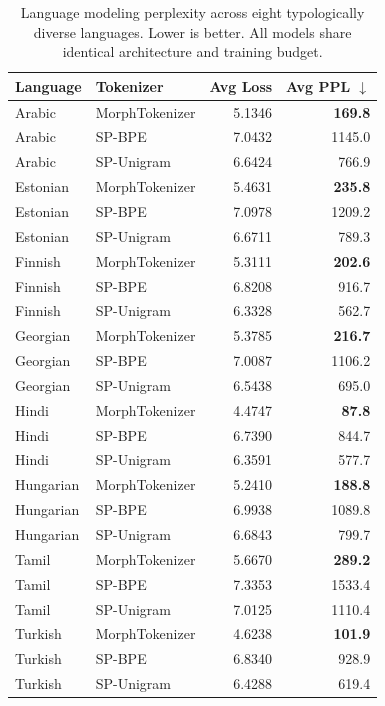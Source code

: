 \begin{table}[t]
\centering
\caption{Language modeling perplexity across eight typologically diverse languages. Lower is better. All models share identical architecture and training budget.}
\label{tab:main_results}
\small
\begin{tabular}{l l r r}
\toprule
\textbf{Language} & \textbf{Tokenizer} & \textbf{Avg Loss} & \textbf{Avg PPL $\downarrow$} \\
\midrule
Arabic & MorphTokenizer & 5.1346 & \textbf{169.8} \\
Arabic & SP-BPE & 7.0432 & 1145.0 \\
Arabic & SP-Unigram & 6.6424 & 766.9 \\
\addlinespace
Estonian & MorphTokenizer & 5.4631 & \textbf{235.8} \\
Estonian & SP-BPE & 7.0978 & 1209.2 \\
Estonian & SP-Unigram & 6.6711 & 789.3 \\
\addlinespace
Finnish & MorphTokenizer & 5.3111 & \textbf{202.6} \\
Finnish & SP-BPE & 6.8208 & 916.7 \\
Finnish & SP-Unigram & 6.3328 & 562.7 \\
\addlinespace
Georgian & MorphTokenizer & 5.3785 & \textbf{216.7} \\
Georgian & SP-BPE & 7.0087 & 1106.2 \\
Georgian & SP-Unigram & 6.5438 & 695.0 \\
\addlinespace
Hindi & MorphTokenizer & 4.4747 & \textbf{87.8} \\
Hindi & SP-BPE & 6.7390 & 844.7 \\
Hindi & SP-Unigram & 6.3591 & 577.7 \\
\addlinespace
Hungarian & MorphTokenizer & 5.2410 & \textbf{188.8} \\
Hungarian & SP-BPE & 6.9938 & 1089.8 \\
Hungarian & SP-Unigram & 6.6843 & 799.7 \\
\addlinespace
Tamil & MorphTokenizer & 5.6670 & \textbf{289.2} \\
Tamil & SP-BPE & 7.3353 & 1533.4 \\
Tamil & SP-Unigram & 7.0125 & 1110.4 \\
\addlinespace
Turkish & MorphTokenizer & 4.6238 & \textbf{101.9} \\
Turkish & SP-BPE & 6.8340 & 928.9 \\
Turkish & SP-Unigram & 6.4288 & 619.4 \\
\bottomrule
\end{tabular}
\end{table}

